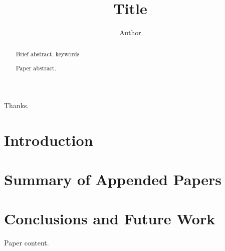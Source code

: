 \documentclass{kaucollection}
\title{Title}
\author{Author}
\institute{Department}
\begin{document}
\frontmatter
\begin{abstract}
  Brief abstract.
  \keywords keywords
\end{abstract}
\begin{acknowledgements}
  Thanks.
\end{acknowledgements}
\tableofcontents
\listofpapers
\mainmatter
\section{Introduction}
\section{Summary of Appended Papers}
\listofsummaries
\section{Conclusions and Future Work}
\begin{kaupaper}[ author=Author
                , title=Paper Title
                , reference=reference text.
                , email=author@kau.se
                , summary=Abstract in the intro.
                , participation=I am the main author.
                , label=paper:shorttitle
                ]
  \maketitle
  \begin{abstract}
    Paper abstract.
  \end{abstract}
  Paper content.
\end{kaupaper}
\end{document}
